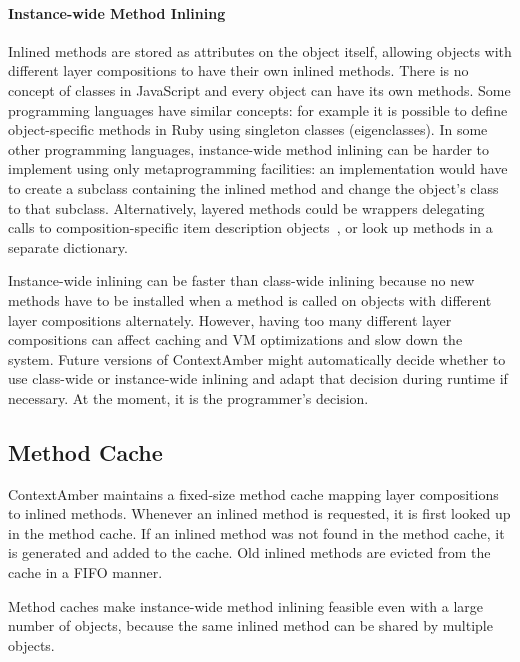 \documentclass{sig-alternate}
\begin{document}

\paragraph{Instance-wide Method Inlining}
Inlined methods are stored as attributes on the object itself, allowing objects with different layer compositions to have their own inlined methods. There is no concept of classes in JavaScript and every object can have its own methods. Some programming languages have similar concepts: for example it is possible to define object-specific methods in Ruby using singleton classes (eigenclasses). In some other programming languages, instance-wide method inlining can be harder to
implement using only metaprogramming facilities: an implementation would have to create a subclass containing the inlined method and change the object's class to that subclass. Alternatively, layered methods could be wrappers delegating calls to composition-specific item description objects~\cite{Coad:1992:OP:130994.131006}, or look up methods in a separate dictionary.

Instance-wide inlining can be faster than class-wide inlining because no new methods have to be installed when a method is called on objects with different layer compositions alternately. However, having too many different layer compositions can affect caching and VM optimizations and slow down the system. Future versions of ContextAmber might automatically decide whether to use class-wide or instance-wide inlining and adapt that decision during runtime if necessary. At the moment, it is the programmer's decision.

\subsection{Method Cache}
ContextAmber maintains a fixed-size method cache mapping layer compositions to inlined methods. Whenever an inlined method is requested, it is first looked up in the method cache. If an inlined method was not found in the method cache, it is generated and added to the cache. Old inlined methods are evicted from the cache in a FIFO manner. 

Method caches make instance-wide method inlining feasible even with a large number of objects, because the same inlined method can be shared by multiple objects.

\end{document}

